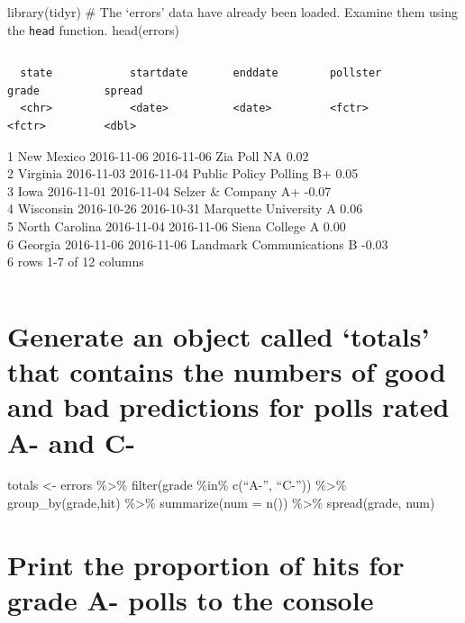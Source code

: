 \documentclass[
]{article}
\begin{document}
library(tidyr) \# The `errors' data have already been loaded. Examine
them using the \texttt{head} function. head(errors)

\begin{verbatim}
\end{verbatim}

\begin{verbatim}
  state            startdate       enddate        pollster                 grade          spread
  <chr>            <date>          <date>         <fctr>                   <fctr>         <dbl>
\end{verbatim}

1 New Mexico 2016-11-06 2016-11-06 Zia Poll NA 0.02\\
2 Virginia 2016-11-03 2016-11-04 Public Policy Polling B+ 0.05\\
3 Iowa 2016-11-01 2016-11-04 Selzer \& Company A+ -0.07\\
4 Wisconsin 2016-10-26 2016-10-31 Marquette University A 0.06\\
5 North Carolina 2016-11-04 2016-11-06 Siena College A 0.00\\
6 Georgia 2016-11-06 2016-11-06 Landmark Communications B -0.03\\
6 rows \textbar{} 1-7 of 12 columns

\begin{verbatim}
\end{verbatim}

\hypertarget{generate-an-object-called-totals-that-contains-the-numbers-of-good-and-bad-predictions-for-polls-rated-a--and-c-}{%
\section{Generate an object called `totals' that contains the numbers of
good and bad predictions for polls rated A- and
C-}\label{generate-an-object-called-totals-that-contains-the-numbers-of-good-and-bad-predictions-for-polls-rated-a--and-c-}}

totals \textless- errors \%\textgreater\% filter(grade \%in\% c(``A-'',
``C-'')) \%\textgreater\% group\_by(grade,hit) \%\textgreater\%
summarize(num = n()) \%\textgreater\% spread(grade, num)

\hypertarget{print-the-proportion-of-hits-for-grade-a--polls-to-the-console}{%
\section{Print the proportion of hits for grade A- polls to the
console}\label{print-the-proportion-of-hits-for-grade-a--polls-to-the-console}}
\end{document}
